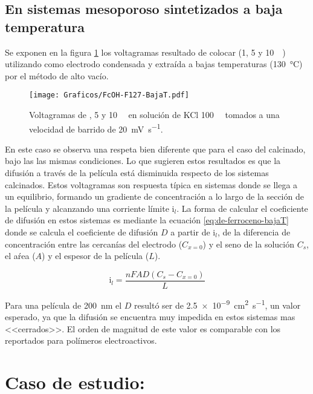 	\subsection{En sistemas mesoporoso sintetizados a baja temperatura}

		Se exponen en la figura \ref{fig:fcoh_bajaT} los voltagramas resultado de colocar \fc\space (1, 5 y \SI{10}{\milli\Molar}) utilizando como electrodo \pdmF\space condensada y extraída a bajas temperaturas (\SI{130}{\celsius}) por el método de alto vacío. 
			\begin{figure}[ht]
				\centering
		 	    \texttt{[image: Graficos/FcOH-F127-BajaT.pdf]}
		        \caption[Voltagrama para \fc\space en \pdm\space de baja temperatura]{Voltagramas de \fc{}, 5 y \SI{10}{\milli\Molar} en solución de KCl \SI{100}{\milli\Molar} tomados a una velocidad de barrido de \SI{20}{\milli\volt\per\second}.}
		        \label{fig:fcoh_bajaT}
		      	\end{figure}
		
		En este caso se observa una respeta bien diferente que para el caso del calcinado, bajo las las mismas condiciones. Lo que sugieren estos resultados es que la difusión a través de la película está disminuida respecto de los sistemas calcinados. Estos voltagramas son respuesta típica en sistemas donde se llega a un equilibrio, formando un gradiente de concentración a lo largo de la sección de la película y alcanzando una corriente límite $\text{i}_l$. 
		La forma de calcular el coeficiente de difusión en estos sistemas es mediante la ecuación \ref{eq:de-ferroceno-bajaT} donde se calcula el coeficiente de difusión $D$ a partir de $\text{i}_l$, de la diferencia de concentración entre las cercanías del electrodo ($C_{x=0}$) y el seno de la solución $C_s$, el aŕea ($A$) y el espesor de la película ($L$).

			\begin{equation}
					\text{i}_l = \frac{nFAD(C_{s}-C_{x=0})}{L}
					\label{eq:de-ferroceno-bajaT}
			\end{equation}
			  	

		Para una película de \SI{200}{nm} el $D$ resultó ser de \SI{2.5e-9}{\square\cm\per\second}, un valor esperado, ya que la difusión se encuentra muy impedida en estos sistemas mas <<cerrados>>. El orden de magnitud de este valor es comparable con los reportados para polímeros electroactivos.\cite{Kolb1993}
			
\section{Caso de estudio: \texorpdfstring{\aminorutenioCompleto}{Ru(NH3)CL3}}
	
